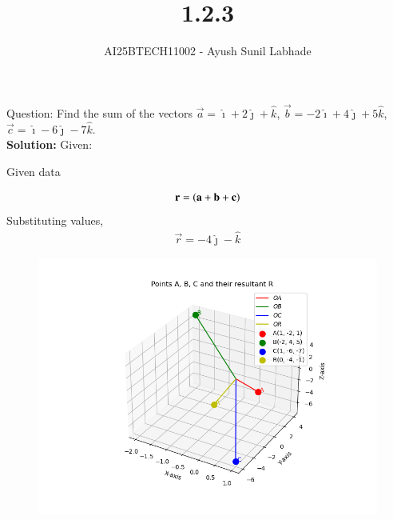 \documentclass[journal,12pt,onecolumn]{IEEEtran}
\begin{document}
\title{1.2.3}
\author{AI25BTECH11002 - Ayush Sunil Labhade}
{\let\newpage\relax\maketitle}
Question:\newline
Find the sum of the vectors $\vec{a}= \hat{\imath}+2\hat{\jmath}+\hat{k}$, $\vec{b}= -2\hat{\imath}+4\hat{\jmath}+5\hat{k}$, $\vec{c}=\hat{\imath}-6\hat{\jmath}-7\hat{k}$. \\
\textbf{Solution:}
Given:
\begin{table}[H]
	\centering
	
	\label{}
	\caption{Given data}
\end{table}
\begin{align}
	\mathbf{r}=\left(\mathbf{a}+\mathbf{b}+\mathbf{c}\right)
\end{align}
Substituting values,\\
\begin{align}
	\vec{r}= -4\hat{\jmath} - \hat{k}
\end{align}
\begin{figure}[H]
	\centering
	\includegraphics[scale=0.5]{plot}
	\caption*{}
	\label{fig}
\end{figure}
\end{document}
